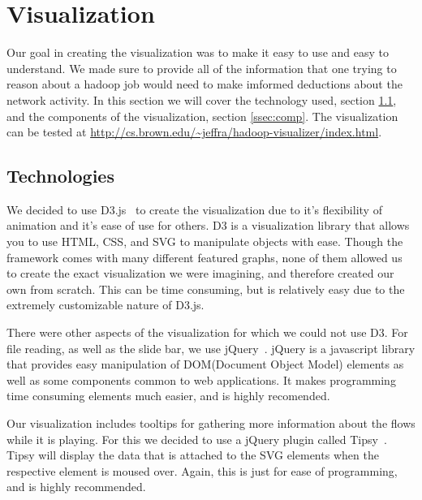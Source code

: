 \section{Visualization}
\label{sec:viz}
Our goal in creating the visualization was to make it easy to use and
easy to understand. We made sure to provide all of the information
that one trying to reason about a hadoop job would need to make
imformed deductions about the network activity. In this section we
will cover the technology used, section \ref{ssec:tech}, and the components of the
visualization, section \ref{ssec:comp}. The visualization can be
tested at \url{http://cs.brown.edu/~jeffra/hadoop-visualizer/index.html}.

\subsection{Technologies}
\label{ssec:tech}
We decided to use D3.js~\cite{D3.js} to create the visualization due to
it's flexibility of animation and it's ease of use for others. D3 is a
visualization library that allows you to use HTML, CSS, and SVG to
manipulate objects with ease. Though the framework comes with many
different featured graphs, none of them allowed us to create the exact
visualization we were imagining, and therefore created our own from
scratch. This can be time consuming, but is relatively easy due to the
extremely customizable nature of D3.js.

There were other aspects of the visualization for which we could not
use D3. For file reading, as well as the slide bar, we use
jQuery~\cite{jQuery}. jQuery is a javascript library that provides
easy manipulation of DOM(Document Object Model) elements as well as
some components common to web applications. It makes programming time
consuming elements much easier, and is highly recomended.

Our visualization includes tooltips for gathering more information
about the flows while it is playing. For this we decided to use a
jQuery plugin called Tipsy~\cite{tipsy}. Tipsy will display the data
that is attached to the SVG elements when the respective element is
moused over. Again, this is just for ease of programming, and is
highly recommended.


